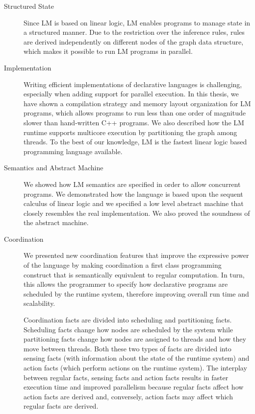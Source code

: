 \begin{description}
   \item[Structured State]

Since LM is based on linear logic, LM enables programs to manage state in a
structured manner. Due to the restriction over the inference rules, rules are
derived independently on different nodes of the graph data structure, which
makes it possible to run LM programs in parallel.

   \item[Implementation]

Writing efficient implementations of declarative languages is challenging,
especially when adding support for parallel execution. In this thesis, we have
shown a compilation strategy and memory layout organization for LM programs,
which allows programs to run less than one order of magnitude slower than
hand-written C++ programs. We also described how the LM runtime supports
multicore execution by partitioning the graph among threads. To the best of our
knowledge, LM is the fastest linear logic based programming language available.

\item[Semantics and Abstract Machine]

We showed how LM semantics are specified in order to allow concurrent
programs. We demonstrated how the language is based upon the sequent calculus of
linear logic and we specified a low level abstract machine that closely
resembles the real implementation. We also proved the soundness of the
abstract machine.

\item[Coordination]

We presented new coordination features that improve the expressive
power of the language by making coordination a first class programming construct
that is semantically equivalent to regular computation. In turn, this allows the
programmer to specify how declarative programs are scheduled by the runtime
system, therefore improving overall run time and scalability.

Coordination facts are divided into scheduling and partitioning facts.
Scheduling facts change how nodes are scheduled by the system while partitioning
facts change how nodes are assigned to threads and how they move between
threads. Both these two types of facts are divided into sensing facts (with
information about the state of the runtime system) and action facts (which
perform actions on the runtime system). The interplay between regular facts,
sensing facts and action facts results in faster execution time and improved
parallelism because regular facts affect how action facts are derived and,
conversely, action facts may affect which regular facts are derived.


\end{description}

